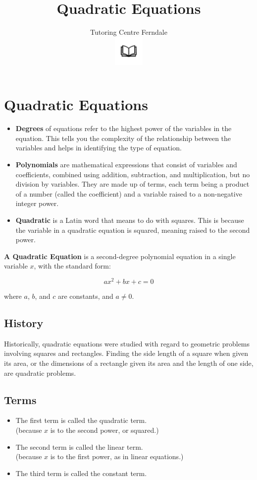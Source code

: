 \documentclass[12pt]{article}
\title{\textbf{Quadratic Equations}}\\
\author{Tutoring Centre Ferndale\\
\includegraphics[width=4em]{ApS_logo.png}}
\date{}
\begin{document}
\maketitle

\section*{Quadratic Equations}

\begin{itemize}
\item \textbf{Degrees} of equations refer to the highest power of the variables in the equation. This tells you the complexity of the relationship between the variables and helps in identifying the type of equation.
\item \textbf{Polynomials} are mathematical expressions that consist of variables and coefficients, combined using addition, subtraction, and multiplication, but no division by variables. They are made up of terms, each term being a product of a number (called the coefficient) and a variable raised to a non-negative integer power.
\item \textbf{Quadratic} is a Latin word that means to do with squares. This is because the variable in a quadratic equation is squared, meaning raised to the second power.\\
\end{itemize}

\textbf{A Quadratic Equation} is a second-degree polynomial equation in a single variable \(x\), with the standard form:

{\Large $$ax^2 + bx + c = 0$$}

where \(a\), \(b\), and \(c\) are constants, and \(a \neq 0\).

\subsection*{History}
Historically, quadratic equations were studied with regard to geometric problems involving squares and rectangles. Finding the side length of a square when given its area, or the dimensions of a rectangle given its area and the length of one side, are quadratic problems.

\subsection*{Terms}
\begin{itemize}
\item The first term is called the quadratic term.\\
(because $x$ is to the second power, or squared.)
\item The second term is called the linear term.\\
(because $x$ is to the first power, as in linear equations.)
\item The third term is called the constant term.
\end{itemize}
\end{document}
